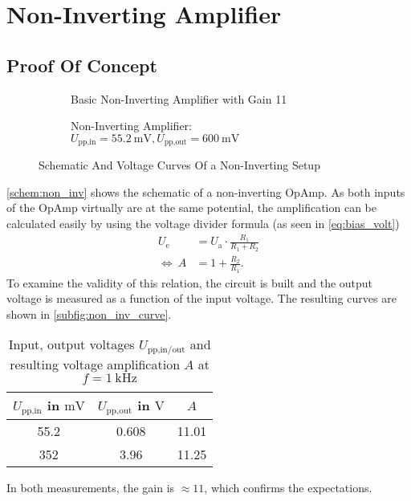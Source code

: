 \chapter{Non-Inverting Amplifier}
\section{Proof Of Concept}
\begin{figure}[tbp]
	\centering
	\begin{subfigure}{0.4\textwidth}
		\centering
		\caption{Basic Non-Inverting Amplifier with Gain 11}
		\label{schem:non_inv}
	\end{subfigure}
	\begin{subfigure}{0.4\textwidth}
		\centering
		\caption{Non-Inverting Amplifier:\newline $U_\text{pp,in}=\SI{55.2}{\milli\volt}, U_\text{pp,out}=\SI{600}{\milli\volt}$}
		\label{subfig:non_inv_curve}
	\end{subfigure}
	\caption{Schematic And Voltage Curves Of a Non-Inverting Setup}
\end{figure}
\autoref{schem:non_inv} shows the schematic of a non-inverting OpAmp.
As both inputs of the OpAmp virtually are at the same potential, the amplification can be calculated easily by using the voltage divider formula (as seen in \autoref{eq:bias_volt})
\begin{align*}
	U_\text{e}&=U_\text{a}\cdot\frac{R_1}{R_1+R_2} \\
	\Leftrightarrow\ A &=1+\frac{R_2}{R_1}.
\end{align*}
To examine the validity of this relation, the circuit is built and the output voltage is measured as a function of the input voltage.
The resulting curves are shown in \autoref{subfig:non_inv_curve}.
\begin{table}[tbp]
	\centering
	\caption{Input, output voltages $U_\text{pp,in/out}$ and resulting voltage amplification $A$ at $f=\SI{1}{\kilo\hertz}$}
	\label{tab:non_inv_vals}
	\begin{tabular}{SSS}
		\toprule
		{$U_\text{pp,in}$ in $\si{\milli\volt}$}&	{$U_\text{pp,out}$ in $\si{\volt}$}&	{$A$}\\
		\midrule
		\num{55.2}	&	\num{0.608}	&	\num{11.01}\\
		\num{352}	&	\num{3.96}	&	\num{11.25}\\
		\bottomrule
	\end{tabular}
\end{table}
In both measurements, the gain is $\approx 11$, which confirms the expectations.

